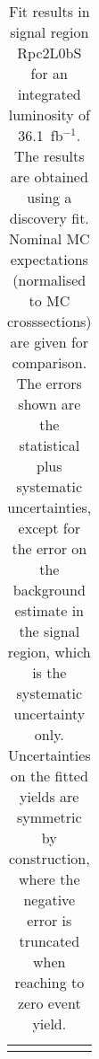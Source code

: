 \begin{table}
\begin{center}
{\begin{tabular*}{\textwidth}{@{\extracolsep{\fill}}lr}
\noalign{\smallskip}\hline\noalign{\smallskip}
\end{tabular*}
}
\end{center}
\caption{Fit results in signal region Rpc2L0bS for an integrated luminosity of 36.1~fb$^{-1}$.
The results are obtained using a discovery fit. Nominal MC expectations (normalised to MC crosssections) are given for comparison.
The errors shown are the statistical plus systematic uncertainties, except for the error on the background estimate in the signal region, which is the systematic uncertainty only.
Uncertainties on the fitted yields are symmetric by construction, where the negative error is truncated when reaching to zero event yield.
}
\label{table.results.systematics.in.logL.fit..Yields.Rpc2L0bS}
\end{table}
\clearpage
%
